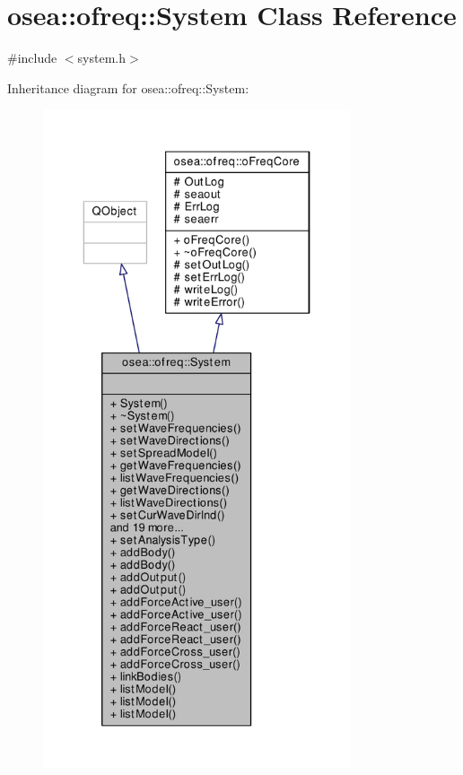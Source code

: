 \hypertarget{classosea_1_1ofreq_1_1_system}{\section{osea\-:\-:ofreq\-:\-:System Class Reference}
\label{classosea_1_1ofreq_1_1_system}
}


{\ttfamily \#include $<$system.\-h$>$}



Inheritance diagram for osea\-:\-:ofreq\-:\-:System\-:
\nopagebreak
\begin{figure}[H]
\begin{center}
\leavevmode
\includegraphics[height=550pt]{classosea_1_1ofreq_1_1_system__inherit__graph}
\end{center}
\end{figure}
